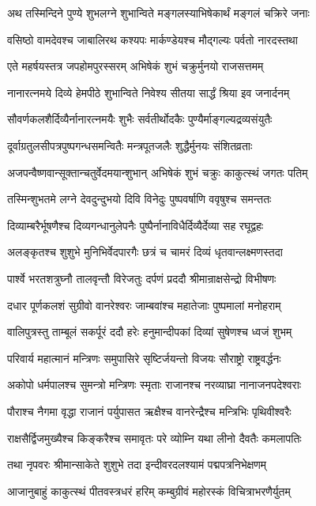 \twolineshloka
{अथ तस्मिन्दिने पुण्ये शुभलग्ने शुभान्विते}
{मङ्गलस्याभिषेकार्थं मङ्गलं चक्रिरे जनाः}%

\twolineshloka
{वसिष्ठो वामदेवश्च जाबालिरथ कश्यपः}
{मार्कण्डेयश्च मौद्गल्यः पर्वतो नारदस्तथा}%

\twolineshloka
{एते महर्षयस्तत्र जपहोमपुरस्सरम्}
{अभिषेकं शुभं चक्रुर्मुनयो राजसत्तमम्}%

\twolineshloka
{नानारत्नमये दिव्ये हेमपीठे शुभान्विते}
{निवेश्य सीतया सार्द्धं श्रिया इव जनार्दनम्}%

\twolineshloka
{सौवर्णकलशैर्दिव्यैर्नानारत्नमयैः शुभैः}
{सर्वतीर्थोदकैः पुण्यैर्माङ्गल्यद्रव्यसंयुतैः}%

\twolineshloka
{दूर्वाग्रतुलसीपत्रपुष्पगन्धसमन्वितैः}
{मन्त्रपूतजलैः शुद्धैर्मुनयः संशितव्रताः}%

\twolineshloka
{अजपन्वैष्णवान्सूक्तान्चतुर्वेदमयान्शुभान्}
{अभिषेकं शुभं चक्रुः काकुत्स्थं जगतः पतिम्}%

\twolineshloka
{तस्मिन्शुभतमे लग्ने देवदुन्दुभयो दिवि}
{विनेदुः पुष्पवर्षाणि ववृषुश्च समन्ततः}%

\twolineshloka
{दिव्याम्बरैर्भूषणैश्च दिव्यगन्धानुलेपनैः}
{पुष्पैर्नानाविधैर्दिव्यैर्देव्या सह रघूद्वहः}%

\twolineshloka
{अलङ्कृतश्च शुशुभे मुनिभिर्वेदपारगैः}
{छत्रं च चामरं दिव्यं धृतवान्लक्ष्मणस्तदा}%

\twolineshloka
{पार्श्वे भरतशत्रुघ्नौ तालवृन्तौ विरेजतुः}
{दर्पणं प्रददौ श्रीमान्राक्षसेन्द्रो विभीषणः}%

\twolineshloka
{दधार पूर्णकलशं सुग्रीवो वानरेश्वरः}
{जाम्बवांश्च महातेजाः पुष्पमालां मनोहराम्}%

\twolineshloka
{वालिपुत्रस्तु ताम्बूलं सकर्पूरं ददौ हरेः}
{हनुमान्दीपकां दिव्यां सुषेणश्च ध्वजं शुभम्}%

\twolineshloka
{परिवार्य महात्मानं मन्त्रिणः समुपासिरे}
{सृष्टिर्जयन्तो विजयः सौराष्ट्रो राष्ट्रवर्द्धनः}%

\twolineshloka
{अकोपो धर्मपालश्च सुमन्त्रो मन्त्रिणः स्मृताः}
{राजानश्च नरव्याघ्रा नानाजनपदेश्वराः}%

\twolineshloka
{पौराश्च नैगमा वृद्धा राजानं पर्युपासत}
{ऋक्षैश्च वानरेन्द्रैश्च मन्त्रिभिः पृथिवीश्वरैः}%

\twolineshloka
{राक्षसैर्द्विजमुख्यैश्च किङ्करैश्च समावृतः}
{परे व्योम्नि यथा लीनो दैवतैः कमलापतिः}%

\twolineshloka
{तथा नृपवरः श्रीमान्साकेते शुशुभे तदा}
{इन्दीवरदलश्यामं पद्मपत्रनिभेक्षणम्}%

\twolineshloka
{आजानुबाहुं काकुत्स्थं पीतवस्त्रधरं हरिम्}
{कम्बुग्रीवं महोरस्कं विचित्राभरणैर्युतम्}%

